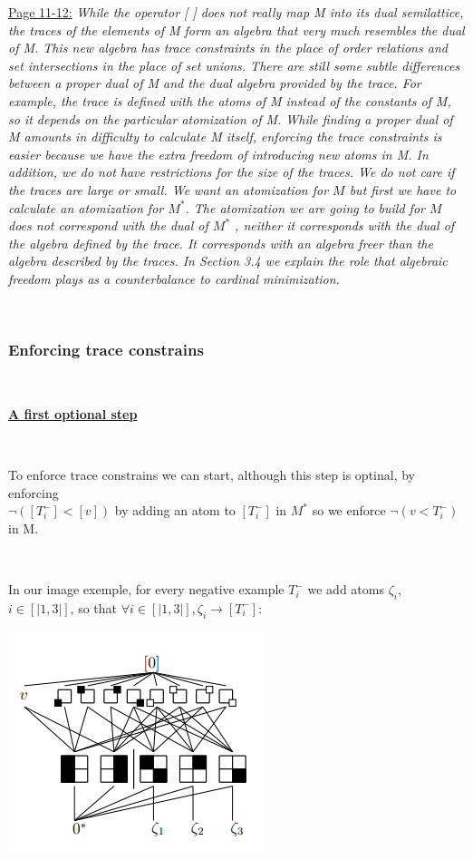 \documentclass[a4paper, 11pt]{article}
\begin{document}
\underline{Page 11-12:}
\textit{
While the operator [ ] does not really map M into its dual semilattice, the traces of the
elements of M form an algebra that very much resembles the dual of M. This new algebra has
trace constraints in the place of order relations and set intersections in the place of set unions.
There are still some subtle differences between a proper dual of M and the dual algebra provided
by the trace. For example, the trace is defined with the atoms of M instead of the constants
of M, so it depends on the particular atomization of M. While finding a proper dual of M
amounts in difficulty to calculate M itself, enforcing the trace constraints is easier because we
have the extra freedom of introducing new atoms in M. In addition, we do not have restrictions
for the size of the traces. We do not care if the traces are large or small.
We want an atomization for $M$ but first we have to calculate an atomization for $M^{\ast}$. The
atomization we are going to build for $M$ does not correspond with the dual of $M^{\ast}$
, neither it
corresponds with the dual of the algebra defined by the trace. It corresponds with an algebra
freer than the algebra described by the traces. In Section 3.4 we explain the role that algebraic
freedom plays as a counterbalance to cardinal minimization.
}

\

\subsubsection{Enforcing trace constrains}

\

\noindent
\textbf{\underline{A first optional step}}

\

To enforce trace constrains we can start, although this step is optinal, by enforcing \\ $\neg([T_i^-] < [v])$ by adding an atom to $[T_i^-]$ in $M^{\ast}$ so we enforce $\neg(v < T_i^-)$ in M.

\

In our image exemple, for every negative example $T_i^-$ we add atoms $\zeta_i$, $i \in [|1,3|]$, so that $\forall i \in [|1,3|], \zeta_i \rightarrow [T_i^-]$:

\begin{center}
    \includegraphics[scale = 0.7]{enforcing.png}
\end{center}
\end{document}
